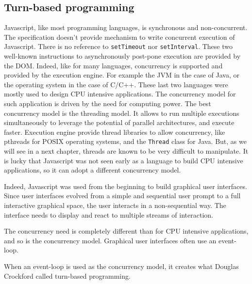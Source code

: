 



\subsection{Turn-based programming}

Javascript, like most programming languages, is synchronous and non-concurrent. The specification doesn't provide mechanism to write concurrent execution of Javascript.
There is no reference to \texttt{setTimeout} nor \texttt{setInterval}.
These two well-known instructions to asynchronously post-pone execution are provided by the DOM.
Indeed, like for many languages, concurrency is supported and provided by the execution engine.
For example the JVM in the case of Java, or the operating system in the case of C/C++.
These last two languages were mostly used to design CPU intensive applications.
The concurrency model for such application is driven by the need for computing power.
The best concurrency model is the threading model.
It allows to run multiple executions simultaneously to leverage the potential of parallel architectures, and execute faster.
Execution engine provide thread libraries to allow concurrency, like pthreads for POSIX operating systems, and the \texttt{Thread} class for Java.
But, as we will see in a next chapter, threads are known to be very difficult to manipulate.
It is lucky that Javascript was not seen early as a language to build CPU intensive applications, so it can adopt a different concurrency model.

Indeed, Javascript was used from the beginning to build graphical user interfaces.
Since user interfaces evolved from a simple and sequential user prompt to a full interactive graphical space, the user interacts in a non-sequential way.
The interface needs to display and react to multiple streams of interaction.

The concurrency need is completely different than for CPU intensive applications, and so is the concurrency model.
Graphical user interfaces often use an event-loop.

When an event-loop is used as the concurrency model, it creates what Douglas Crockford called turn-based programming.

